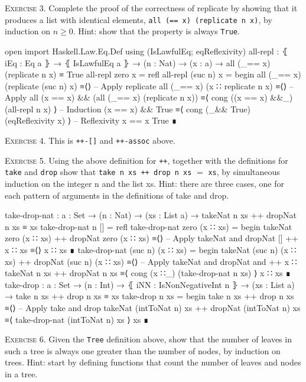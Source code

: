 \documentclass{article}
\begin{document}
\noindent
\textsc{Exercise 3.}
Complete the proof of the correctness of replicate by showing that it produces a list with identical elements, \verb!all (== x) (replicate n x)!, by induction on $n ≥ 0$. Hint: show that the property is always \verb!True!.

\begin{code}
open import Haskell.Law.Eq.Def using (IsLawfulEq; eqReflexivity)
all-repl : ⦃ iEq : Eq a ⦄ → ⦃ IsLawfulEq a ⦄ → (n : Nat) → (x : a)
    → all (_== x) (replicate n x) ≡ True
all-repl zero x = refl
all-repl (suc n) x =
  begin
    all (_== x) (replicate (suc n) x)
  ≡⟨⟩ -- Apply replicate
    all (_== x) (x ∷ replicate n x)
  ≡⟨⟩ -- Apply all
    (x == x) && (all (_== x) (replicate n x))
  ≡⟨ cong ((x == x) &&_) (all-repl n x) ⟩ -- Induction
    (x == x) && True
  ≡⟨ cong (_&& True) (eqReflexivity x) ⟩ -- Reflexivity x == x
    True
  ∎
\end{code}

\noindent
\textsc{Exercise 4.} This is \verb!++-[]! and \verb!++-assoc! above.
\vspace{3pt}

\noindent
\textsc{Exercise 5.} Using the above definition for \texttt{++}, together with the definitions for \texttt{take} and \texttt{drop} show that \verb!take n xs ++ drop n xs! $=$ \verb!xs!, by simultaneous induction on the integer n and the list xs. Hint: there are three cases, one for each pattern of arguments in the definitions of take and drop.

\begin{code}
take-drop-nat : {a : Set} → (n : Nat) → (xs : List a)
    → takeNat n xs ++ dropNat n xs ≡ xs
take-drop-nat n [] = refl
take-drop-nat zero (x ∷ xs) =
  begin
    takeNat zero (x ∷ xs) ++ dropNat zero (x ∷ xs)
  ≡⟨⟩ -- Apply takeNat and dropNat
    [] ++ x ∷ xs
  ≡⟨⟩
    x ∷ xs
  ∎
take-drop-nat (suc n) (x ∷ xs) =
  begin
    takeNat (suc n) (x ∷ xs) ++ dropNat (suc n) (x ∷ xs)
  ≡⟨⟩ -- Apply takeNat and dropNat and ++
    x ∷ takeNat n xs ++ dropNat n xs
  ≡⟨ cong (x ∷_) (take-drop-nat n xs) ⟩
    x ∷ xs
  ∎
take-drop : {a : Set} → (n : Int) → ⦃ iNN : IsNonNegativeInt n ⦄
    → (xs : List a) → take n xs ++ drop n xs ≡ xs
take-drop n xs =
  begin
    take n xs ++ drop n xs
  ≡⟨⟩ -- Apply take and drop
    takeNat (intToNat n) xs ++ dropNat (intToNat n) xs
  ≡⟨ take-drop-nat (intToNat n) xs ⟩
    xs
  ∎
\end{code}

\noindent
\textsc{Exercise 6.} Given the \texttt{Tree} definition above, show that the number of leaves in such a tree is always one greater than the number of nodes, by induction on trees. Hint: start by defining functions that count the number of leaves and nodes in a tree.
\end{document}
